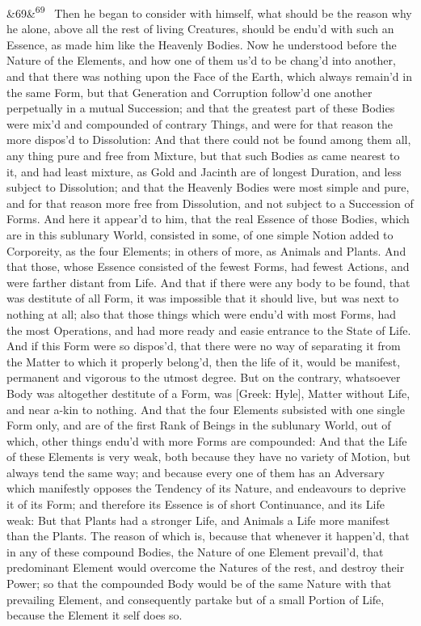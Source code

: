 \documentclass[12pt]{article}
\newcommand{\para}[1][]{\par\noindent\ifx&#1&\else\textsuperscript{\footnotesize #1}~\fi}
\begin{document}
\para[69] Then he began to consider with himself, what should be the reason why he alone, above all the rest of living Creatures, should be endu'd with such an Essence, as made him like the Heavenly Bodies. Now he understood before the Nature of the Elements, and how one of them us'd to be chang'd into another, and that there was nothing upon the Face of the Earth, which always remain'd in the same Form, but that Generation and Corruption follow'd one another perpetually in a mutual Succession; and that the greatest part of these Bodies were mix'd and compounded of contrary Things, and were for that reason the more dispos'd to Dissolution: And that there could not be found among them all, any thing pure and free from Mixture, but that such Bodies as came nearest to it, and had least mixture, as Gold and Jacinth are of longest Duration, and less subject to Dissolution; and that the Heavenly Bodies were most simple and pure, and for that reason more free from Dissolution, and not subject to a Succession of Forms. And here it appear'd to him, that the real Essence of those Bodies, which are in this sublunary World, consisted in some, of one simple Notion added to Corporeity, as the four Elements; in others of more, as Animals and Plants. And that those, whose Essence consisted of the fewest Forms, had fewest Actions, and were farther distant from Life. And that if there were any body to be found, that was destitute of all Form, it was impossible that it should live, but was next to nothing at all; also that those things which were endu'd with most Forms, had the most Operations, and had more ready and easie entrance to the State of Life. And if this Form were so dispos'd, that there were no way of separating it from the Matter to which it properly belong'd, then the life of it, would be manifest, permanent and vigorous to the utmost degree. But on the contrary, whatsoever Body was altogether destitute of a Form, was [Greek: Hyle], Matter without Life, and near a-kin to nothing. And that the four Elements subsisted with one single Form only, and are of the first Rank of Beings in the sublunary World, out of which, other things endu'd with more Forms are compounded: And that the Life of these Elements is very weak, both because they have no variety of Motion, but always tend the same way; and because every one of them has an Adversary which manifestly opposes the Tendency of its Nature, and endeavours to deprive it of its Form; and therefore its Essence is of short Continuance, and its Life weak: But that Plants had a stronger Life, and Animals a Life more manifest than the Plants. The reason of which is, because that whenever it happen'd, that in any of these compound Bodies, the Nature of one Element prevail'd, that predominant Element would overcome the Natures of the rest, and destroy their Power; so that the compounded Body would be of the same Nature with that prevailing Element, and consequently partake but of a small Portion of Life, because the Element it self does so.
\end{document}
